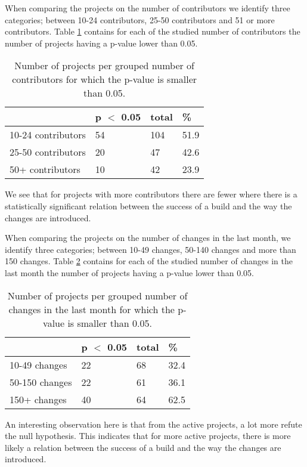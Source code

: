 When comparing the projects on the number of contributors we identify three categories; between 10-24 contributors, 25-50 contributors and 51 or more contributors.
Table \ref{tab:p-for-contributors} contains for each of the studied number of contributors the number of projects having a p-value lower than 0.05.
\begin{table}[h]
\begin{tabular}{ l | l l l}
 & p $<$ 0.05 & total & \%\\
\hline
10-24 contributors & 54 & 104 & 51.9\\
25-50 contributors & 20 & 47 & 42.6 \\
50+ contributors & 10 & 42 & 23.9
\end{tabular}
\caption{Number of projects per grouped number of contributors for which the p-value is smaller than 0.05.}
\label{tab:p-for-contributors}
\end{table}
We see that for projects with more contributors there are fewer where there is a statistically significant relation between the success of a build and the way the changes are introduced.

When comparing the projects on the number of changes in the last month, we identify three categories; between 10-49 changes, 50-140 changes and more than 150 changes.
Table \ref{tab:p-for-changes} contains for each of the studied number of changes in the last month the number of projects having a p-value lower than 0.05.
\begin{table}[h]
\begin{tabular}{ l | l l l}
 & p $<$ 0.05 & total & \%\\
\hline
10-49 changes & 22 & 68 & 32.4\\
50-150 changes & 22 & 61 & 36.1 \\
150+ changes & 40 & 64 & 62.5
\end{tabular}
\caption{Number of projects per grouped number of changes in the last month for which the p-value is smaller than 0.05.}
\label{tab:p-for-changes}
\end{table}
An interesting observation here is that from the active projects, a lot more refute the null hypothesis. 
This indicates that for more active projects, there is more likely a relation between the success of a build and the way the changes are introduced.





















